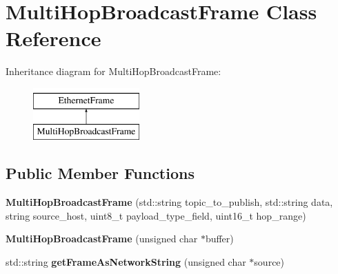 \hypertarget{classMultiHopBroadcastFrame}{\section{Multi\-Hop\-Broadcast\-Frame Class Reference}
\label{classMultiHopBroadcastFrame}
}
Inheritance diagram for Multi\-Hop\-Broadcast\-Frame\-:\begin{figure}[H]
\begin{center}
\leavevmode
\includegraphics[height=2.000000cm]{classMultiHopBroadcastFrame}
\end{center}
\end{figure}
\subsection*{Public Member Functions}
\begin{DoxyCompactItemize}
\item 
\hypertarget{classMultiHopBroadcastFrame_a0d3aaa1aff406a09aba58d5a3de3d24e}{{\bfseries Multi\-Hop\-Broadcast\-Frame} (std\-::string topic\-\_\-to\-\_\-publish, std\-::string data, string source\-\_\-host, uint8\-\_\-t payload\-\_\-type\-\_\-field, uint16\-\_\-t hop\-\_\-range)}\label{classMultiHopBroadcastFrame_a0d3aaa1aff406a09aba58d5a3de3d24e}

\item 
\hypertarget{classMultiHopBroadcastFrame_a44124c28205fae156e4107763cd6a0a8}{{\bfseries Multi\-Hop\-Broadcast\-Frame} (unsigned char $\ast$buffer)}\label{classMultiHopBroadcastFrame_a44124c28205fae156e4107763cd6a0a8}

\item 
\hypertarget{classMultiHopBroadcastFrame_a4dad86835ff3d79ba9462e030ae019c9}{std\-::string {\bfseries get\-Frame\-As\-Network\-String} (unsigned char $\ast$source)}\label{classMultiHopBroadcastFrame_a4dad86835ff3d79ba9462e030ae019c9}

\end{DoxyCompactItemize}
